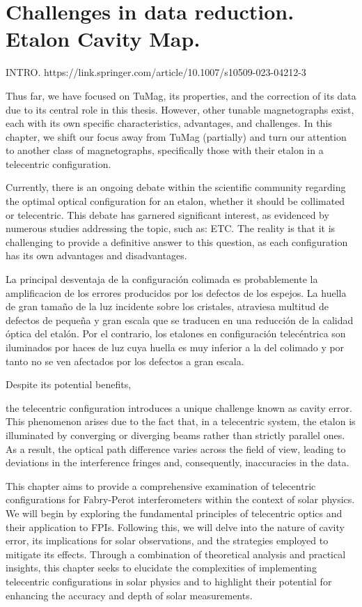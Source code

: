 \chapter{\label{CH:challenges}Challenges in data reduction.\\Etalon Cavity Map.}

INTRO.
https://link.springer.com/article/10.1007/s10509-023-04212-3

Thus far, we have focused on TuMag, its properties, and the correction of its data due to its central role in this thesis. However, other tunable magnetographs exist, each with its own specific characteristics, advantages, and challenges. In this chapter, we shift our focus away from TuMag (partially) and turn our attention to another class of magnetographs, specifically those with their etalon in a telecentric configuration.

Currently, there is an ongoing debate within the scientific community regarding the optimal optical configuration for an etalon, whether it should be collimated or telecentric. This debate has garnered significant interest, as evidenced by numerous studies addressing the topic, such as: ETC. The reality is that it is challenging to provide a definitive answer to this question, as each configuration has its own advantages and disadvantages.

La principal desventaja de la configuración colimada es probablemente la amplificacion de los errores producidos por los defectos de los espejos. La huella de gran tamaño de la luz incidente sobre los cristales, atraviesa multitud de defectos de pequeña y gran escala que se traducen en una reducción de la calidad óptica del etalón. Por el contrario, los etalones en configuración telecéntrica son iluminados por haces de luz cuya huella es muy inferior a la del colimado y por tanto no se ven afectados por los defectos a gran escala.  

Despite its potential benefits, 

the telecentric configuration introduces a unique challenge known as cavity error. This phenomenon arises due to the fact that, in a telecentric system, the etalon is illuminated by converging or diverging beams rather than strictly parallel ones. As a result, the optical path difference varies across the field of view, leading to deviations in the interference fringes and, consequently, inaccuracies in the data.

This chapter aims to provide a comprehensive examination of telecentric configurations for Fabry-Perot interferometers within the context of solar physics. We will begin by exploring the fundamental principles of telecentric optics and their application to FPIs. Following this, we will delve into the nature of cavity error, its implications for solar observations, and the strategies employed to mitigate its effects. Through a combination of theoretical analysis and practical insights, this chapter seeks to elucidate the complexities of implementing telecentric configurations in solar physics and to highlight their potential for enhancing the accuracy and depth of solar measurements.

